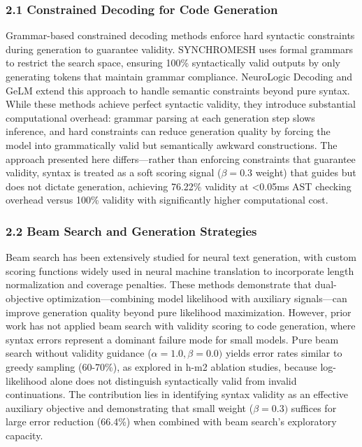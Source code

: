 
\subsubsection{2.1 Constrained Decoding for Code Generation}

Grammar-based constrained decoding methods enforce hard syntactic constraints during generation to guarantee validity. SYNCHROMESH uses formal grammars to restrict the search space, ensuring 100\% syntactically valid outputs by only generating tokens that maintain grammar compliance. NeuroLogic Decoding and GeLM extend this approach to handle semantic constraints beyond pure syntax. While these methods achieve perfect syntactic validity, they introduce substantial computational overhead: grammar parsing at each generation step slows inference, and hard constraints can reduce generation quality by forcing the model into grammatically valid but semantically awkward constructions. The approach presented here differs---rather than enforcing constraints that guarantee validity, syntax is treated as a soft scoring signal ($\beta =0.3$ weight) that guides but does not dictate generation, achieving 76.22\% validity at <0.05ms AST checking overhead versus 100\% validity with significantly higher computational cost.

\subsubsection{2.2 Beam Search and Generation Strategies}

Beam search has been extensively studied for neural text generation, with custom scoring functions widely used in neural machine translation to incorporate length normalization and coverage penalties. These methods demonstrate that dual-objective optimization---combining model likelihood with auxiliary signals---can improve generation quality beyond pure likelihood maximization. However, prior work has not applied beam search with validity scoring to code generation, where syntax errors represent a dominant failure mode for small models. Pure beam search without validity guidance ($\alpha =1.0, \beta =0.0)$ yields error rates similar to greedy sampling (60-70\%), as explored in h-m2 ablation studies, because log-likelihood alone does not distinguish syntactically valid from invalid continuations. The contribution lies in identifying syntax validity as an effective auxiliary objective and demonstrating that small weight ($\beta =0.3)$ suffices for large error reduction (66.4\%) when combined with beam search's exploratory capacity.

